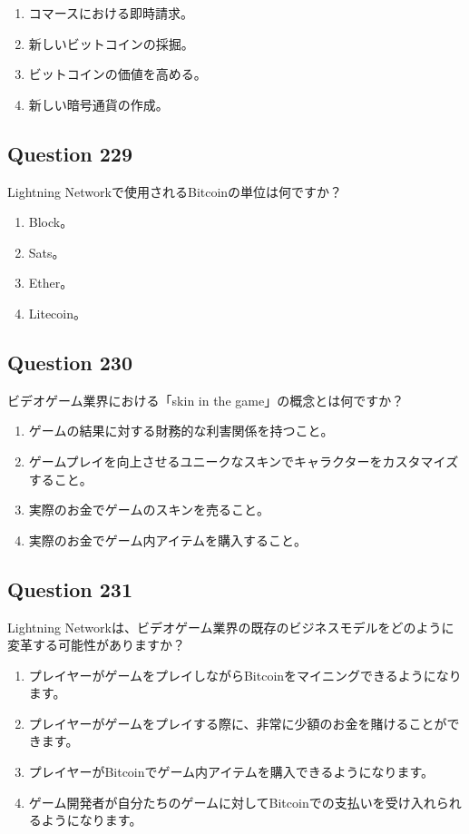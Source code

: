\documentclass[12pt,a4paper]{article}
\begin{document}
\begin{enumerate}[label=\Alph*., leftmargin=*]
\item コマースにおける即時請求。
\item 新しいビットコインの採掘。
\item ビットコインの価値を高める。
\item 新しい暗号通貨の作成。
\end{enumerate}

\bigskip


\subsection*{Question 229}
Lightning Networkで使用されるBitcoinの単位は何ですか？

\begin{enumerate}[label=\Alph*., leftmargin=*]
\item Block。
\item Sats。
\item Ether。
\item Litecoin。
\end{enumerate}

\bigskip


\subsection*{Question 230}
ビデオゲーム業界における「skin in the game」の概念とは何ですか？

\begin{enumerate}[label=\Alph*., leftmargin=*]
\item ゲームの結果に対する財務的な利害関係を持つこと。
\item ゲームプレイを向上させるユニークなスキンでキャラクターをカスタマイズすること。
\item 実際のお金でゲームのスキンを売ること。
\item 実際のお金でゲーム内アイテムを購入すること。
\end{enumerate}

\bigskip


\subsection*{Question 231}
Lightning Networkは、ビデオゲーム業界の既存のビジネスモデルをどのように変革する可能性がありますか？

\begin{enumerate}[label=\Alph*., leftmargin=*]
\item プレイヤーがゲームをプレイしながらBitcoinをマイニングできるようになります。
\item プレイヤーがゲームをプレイする際に、非常に少額のお金を賭けることができます。
\item プレイヤーがBitcoinでゲーム内アイテムを購入できるようになります。
\item ゲーム開発者が自分たちのゲームに対してBitcoinでの支払いを受け入れられるようになります。
\end{enumerate}
\end{document}

